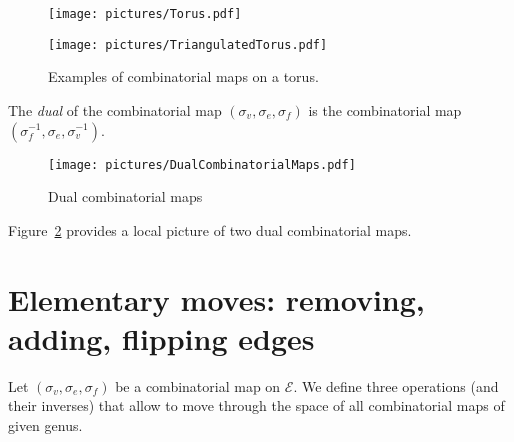 \documentclass{article}
\def\cE{\mathcal{E}}
\begin{document}
\begin{figure}[!ht]
\begin{minipage}{0.4\textwidth}
\begin{center}
\texttt{[image: pictures/Torus.pdf]}
\end{center}
\end{minipage}
\hspace{0.1\textwidth}
\begin{minipage}{0.4\textwidth}
\begin{center}
\texttt{[image: pictures/TriangulatedTorus.pdf]}
\end{center}
\end{minipage}
\caption{Examples of combinatorial maps on a torus.}
\label{fig:CombinatorialMapTori}
\end{figure}


The \emph{dual} of the combinatorial map $(\sigma_v, \sigma_e, \sigma_f)$ is the combinatorial
map $(\sigma_f^{-1}, \sigma_e, \sigma_v^{-1})$.
\begin{figure}[!ht]
\begin{center}
\texttt{[image: pictures/DualCombinatorialMaps.pdf]}
\end{center}
\caption{Dual combinatorial maps}
\label{fig:DualCombinatorialMaps}
\end{figure}

Figure~\ref{fig:DualCombinatorialMaps} provides a local picture of two dual
combinatorial maps.

\section{Elementary moves: removing, adding, flipping edges}
\label{sec:ElementaryMoves}
Let $(\sigma_v, \sigma_e, \sigma_f)$ be a combinatorial map on $\cE$. We define three operations
(and their inverses) that allow to move through the space of all combinatorial maps of given genus.
\end{document}
